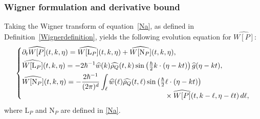 \documentclass[JEP,XML,SOM,Unicode]{cedram}
\newenvironment{mycases}
{\begin{dcases*}}
{\end{dcases*}}
\theoremstyle{plain}
\theoremstyle{remark}
\newcommand{\br}[1]{\left(#1\right)}
\newcommand{\p}{\partial}
\newcommand{\mytextfrac}[2]{{\textstyle\frac{#1}{#2}}}
\begin{document}
\subsubsection{Wigner formulation and derivative bound} Taking the Wigner transform of equation~\eqref{Na}, as defined in Definition~\ref{Wignerdefinition}, yields the following evolution equation for $\widehat{W[P]}$:\vspace*{-3pt}
\begin{align}\label{WL}
\begin{mycases}
\p_t\widehat{W[P]}(t,k,\eta)=\widehat{W[{\mathrm{L}_P}]}(t,k,\eta)+\widehat{W[{\mathrm{N}_P}]}(t,k,\eta),\\
\widehat{W[{\mathrm{L}_P}]}(t,k,\eta)=-2\hbar^{-1}\widehat w(k)\widehat{\rho_Q}(t,k)\sin\br{\mytextfrac{\hbar}{2}k\cdot(\eta-kt)}\widehat g(\eta-kt),\\
\widehat{W[{\mathrm{N}_P}]}(t,k,\eta)=-\frac{2\hbar^{-1}}{(2\pi)^d}\int_\ell \widehat{w}(\ell )\widehat{\rho_Q}(t,\ell )\sin\br{\mytextfrac{\hbar}{2}\ell \cdot(\eta-kt)}\\[-5pt]
\hspace*{7cm}{}\times\widehat{W[P]}(t,k-\ell ,\eta-\ell t)\,d\ell,
\end{mycases}
\end{align}where $\mathrm{L}_{P}$ and $\mathrm{N}_{P}$ are defined in \eqref{Na}.
\end{document}
